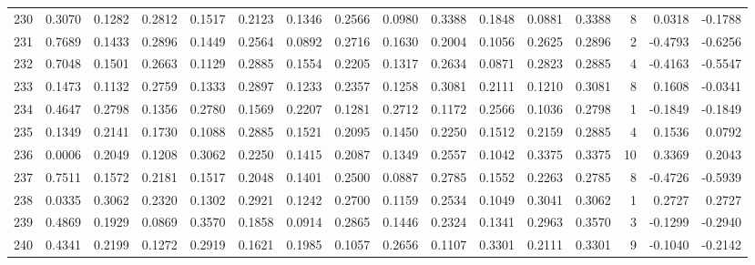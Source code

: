 \begin{tabular}{lrrrrrrrrrrrrrrr}
230 &      0.3070 &  0.1282 &  0.2812 &  0.1517 &  0.2123 &  0.1346 &  0.2566 &  0.0980 &  0.3388 &  0.1848 &   0.0881 &     0.3388 &      8 &                    0.0318 &                    -0.1788 \\
231 &      0.7689 &  0.1433 &  0.2896 &  0.1449 &  0.2564 &  0.0892 &  0.2716 &  0.1630 &  0.2004 &  0.1056 &   0.2625 &     0.2896 &      2 &                   -0.4793 &                    -0.6256 \\
232 &      0.7048 &  0.1501 &  0.2663 &  0.1129 &  0.2885 &  0.1554 &  0.2205 &  0.1317 &  0.2634 &  0.0871 &   0.2823 &     0.2885 &      4 &                   -0.4163 &                    -0.5547 \\
233 &      0.1473 &  0.1132 &  0.2759 &  0.1333 &  0.2897 &  0.1233 &  0.2357 &  0.1258 &  0.3081 &  0.2111 &   0.1210 &     0.3081 &      8 &                    0.1608 &                    -0.0341 \\
234 &      0.4647 &  0.2798 &  0.1356 &  0.2780 &  0.1569 &  0.2207 &  0.1281 &  0.2712 &  0.1172 &  0.2566 &   0.1036 &     0.2798 &      1 &                   -0.1849 &                    -0.1849 \\
235 &      0.1349 &  0.2141 &  0.1730 &  0.1088 &  0.2885 &  0.1521 &  0.2095 &  0.1450 &  0.2250 &  0.1512 &   0.2159 &     0.2885 &      4 &                    0.1536 &                     0.0792 \\
236 &      0.0006 &  0.2049 &  0.1208 &  0.3062 &  0.2250 &  0.1415 &  0.2087 &  0.1349 &  0.2557 &  0.1042 &   0.3375 &     0.3375 &     10 &                    0.3369 &                     0.2043 \\
237 &      0.7511 &  0.1572 &  0.2181 &  0.1517 &  0.2048 &  0.1401 &  0.2500 &  0.0887 &  0.2785 &  0.1552 &   0.2263 &     0.2785 &      8 &                   -0.4726 &                    -0.5939 \\
238 &      0.0335 &  0.3062 &  0.2320 &  0.1302 &  0.2921 &  0.1242 &  0.2700 &  0.1159 &  0.2534 &  0.1049 &   0.3041 &     0.3062 &      1 &                    0.2727 &                     0.2727 \\
239 &      0.4869 &  0.1929 &  0.0869 &  0.3570 &  0.1858 &  0.0914 &  0.2865 &  0.1446 &  0.2324 &  0.1341 &   0.2963 &     0.3570 &      3 &                   -0.1299 &                    -0.2940 \\
240 &      0.4341 &  0.2199 &  0.1272 &  0.2919 &  0.1621 &  0.1985 &  0.1057 &  0.2656 &  0.1107 &  0.3301 &   0.2111 &     0.3301 &      9 &                   -0.1040 &                    -0.2142 \\

\end{tabular}
